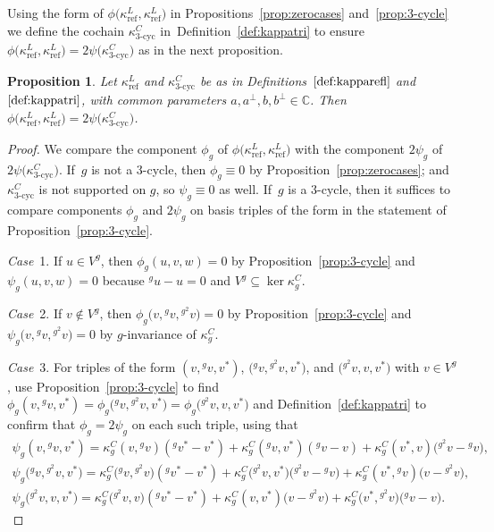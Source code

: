 \documentclass[10pt,a4paper]{amsart}
\numberwithin{equation}{section}
\newtheorem{Proposition}[Theorem]{Proposition}
 { \theoremstyle{definition}
\newtheorem{Definition}[Theorem]{Definition}
\newtheorem{Remark}[Theorem]{Remark}
\newtheorem{case}{Case}}
\newcommand{\actby}[1]{{}^{#1}}
\newcommand{\actbylessspace}[1]{{}^{#1}\!}
\DeclareMathOperator{\refl}{ref}
\DeclareMathOperator{\tri}{3-cyc}
\begin{document}
Using the form of $\phi\big(\kappa^L_{\refl},\kappa^L_{\refl}\big)$ in Propositions~\ref{prop:zerocases} and~\ref{prop:3-cycle} we define
the cochain $\kappa^C_{\tri}$ in~Defi\-nition~\ref{def:kappatri} to
ensure $\phi\big(\kappa^L_{\refl},\kappa^L_{\refl}\big)=2\psi\big(\kappa^C_{\tri}\big)$
as in the next proposition.

\begin{Proposition}\label{prop:phiL2L2=2psiC3}
 Let $\kappa^L_{\refl}$ and $\kappa^C_{\tri}$
 be as in Definitions~$\ref{def:kapparefl}$ and $\ref{def:kappatri}$, with common
 parameters $a,a^\perp,b,b^\perp \in\mathbb{C}$. Then
 $\phi\big(\kappa^L_{\refl},\kappa^L_{\refl}\big)=2\psi\big(\kappa^C_{\tri}\big)$.
\end{Proposition}

\begin{proof}
	We compare the component $\phi_g$ of $\phi\big(\kappa^L_{\refl},\kappa^L_{\refl}\big)$
	with the component $2\psi_g$ of $2\psi\big(\kappa^C_{\tri}\big)$. If~$g$ is not a $3$-cycle, then $\phi_g\equiv 0$ by Proposition~\ref{prop:zerocases};
	and $\kappa^C_{\tri}$ is not supported on $g$, so $\psi_g\equiv 0$ as well.
	If~$g$ is a $3$-cycle, then it suffices to compare components $\phi_g$ and $2\psi_g$
	on basis triples of the form in the statement of Proposition~\ref{prop:3-cycle}.
	
\textit{Case}~1. If $u\in V^g$, then
$\phi_g(u,v,w)=0$
by Proposition~\ref{prop:3-cycle} and $\psi_g(u,v,w)=0$ because $\actby{g}u-u=0$ and $V^g\subseteq\ker\kappa^C_g$.

\textit{Case}~2. If $v \notin V^g$, then $\phi_{g}\big(v,\actby{g}v,\actbylessspace{g^2}v\big)=0$
by Proposition~\ref{prop:3-cycle} and $\psi_{g}\big(v,\actby{g}v,\actbylessspace{g^2}v\big)=0$
by $g$-invariance of $\kappa^C_g$.
	
\textit{Case}~3. For triples of the form
$(v,\actby{g}v,v^*)$, $\big(\actby{g}v,\actbylessspace{g^2}v,v^*\big)$, and $\big(\actbylessspace{g^2}v,v,v^*\big)$ with $v \in V^g$, use Proposition~\ref{prop:3-cycle} to find $\phi_{g}(v,\actby{g}v,v^*)=\phi_{g}\big(\actby{g}v,\actbylessspace{g^2}v,v^*\big)=\phi_{g}\big(\actbylessspace{g^2}v,v,v^*\big)$
and Definition~\ref{def:kappatri} to confirm that $\phi_g=2\psi_g$ on each such triple, using that
\begin{gather*}
	\psi_{g}(v,\actby{g}v,v^*)
	=\kappa^C_g(v,\actby{g}v)(\actby{g}v^*-v^*)
	+\kappa^C_g(\actby{g}v,v^*)(\actby{g}v-v)
	+\kappa^C_g(v^*,v)\big(\actbylessspace{g^2}v-\actby{g}v\big), \\
	\psi_{g}\big(\actby{g}v,\actbylessspace{g^2}v,v^*\big)
	=\kappa^C_g\big(\actby{g}v,\actbylessspace{g^2}v\big)(\actby{g}v^*-v^*)
	+\kappa^C_g\big(\actbylessspace{g^2}v,v^*\big)\big(\actbylessspace{g^2}v-\actby{g}v\big)
	+\kappa^C_g(v^*,\actby{g}v)\big(v-\actbylessspace{g^2}v\big), \\
	\psi_{g}\big(\actbylessspace{g^2}v,v,v^*\big)
	=\kappa^C_g\big(\actbylessspace{g^2}v,v\big)(\actby{g}v^*-v^*)
	+\kappa^C_g(v,v^*)\big(v-\actbylessspace{g^2}v\big)
	+\kappa^C_g\big(v^*,\actbylessspace{g^2}v)(\actby{g}v-v\big).
\tag*{\qed}
\end{gather*}
\renewcommand{\qed}{}
\end{proof}
\end{document}
